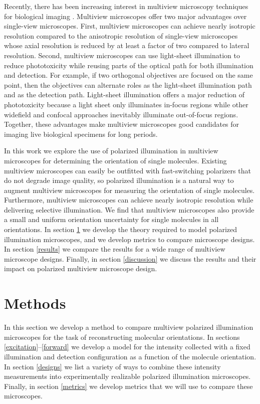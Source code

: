 \documentclass[10pt]{article}
\begin{document}
Recently, there has been increasing interest in multiview microscopy techniques
for biological imaging \cite{wu2013, keller2015, wu2016, wu2017}. Multiview
microscopes offer two major advantages over single-view microscopes. First,
multiview microscopes can achieve nearly isotropic resolution compared to the
anisotropic resolution of single-view microscopes whose axial resolution is
reduced by at least a factor of two compared to lateral resolution. Second,
multiview microscopes can use light-sheet illumination to reduce phototoxicity
while reusing parts of the optical path for both illumination and detection. For
example, if two orthogonal objectives are focused on the same point, then the
objectives can alternate roles as the light-sheet illumination path and as the
detection path. Light-sheet illumination offers a major reduction of
phototoxicity because a light sheet only illuminates in-focus regions while
other widefield and confocal approaches inevitably illuminate out-of-focus
regions. Together, these advantages make multiview microscopes good candidates
for imaging live biological specimens for long periods.

In this work we explore the use of polarized illumination in multiview
microscopes for determining the orientation of single molecules. Existing
multiview microscopes can easily be outfitted with fast-switching polarizers
that do not degrade image quality, so polarized illumination is a natural way to
augment multiview microscopes for measuring the orientation of single
molecules. Furthermore, multiview microscopes can achieve nearly isotropic
resolution while delivering selective illumination. We find that multiview
microscopes also provide a small and uniform orientation uncertainty for single
molecules in all orientations. In section \ref{methods} we develop the theory
required to model polarized illumination microscopes, and we develop metrics to
compare microscope designs. In section \ref{results} we compare the results for
a wide range of multiview microscope designs. Finally, in section
\ref{discussion} we discuss the results and their impact on polarized multiview
microscope design.

\section{Methods}\label{methods}
In this section we develop a method to compare multiview polarized illumination
microscopes for the task of reconstructing molecular orientations. In sections
\ref{excitation}--\ref{forward} we develop a model for the intensity collected
with a fixed illumination and detection configuration as a function of the
molecule orientation. In section \ref{designs} we list a variety of ways to
combine these intensity measurements into experimentally realizable polarized
illumination microscopes. Finally, in section \ref{metrics} we develop metrics
that we will use to compare these microscopes.
\end{document}
